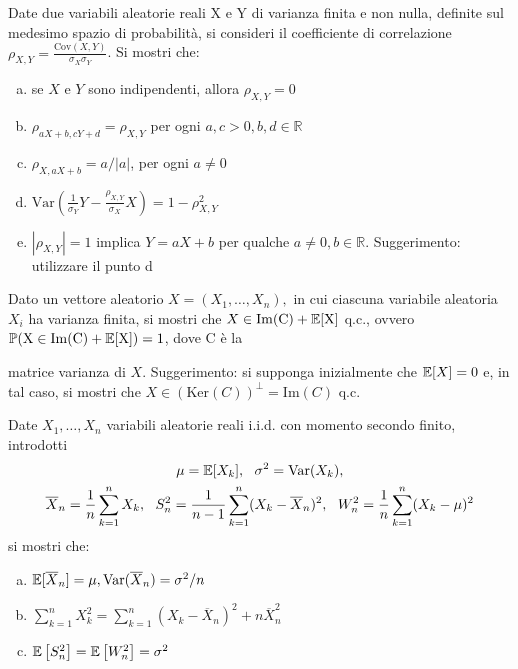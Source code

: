 
\ParteEsercizi

\Esercizio{}

Date due variabili aleatorie reali X e Y di varianza finita e non nulla, definite sul medesimo spazio di probabilità, si consideri il coefficiente di correlazione $\rho_{X,Y} =\frac{\mathrm{Cov} (X,Y)}{\sigma_{X} \sigma_{Y}}$. Si mostri che:
\begin{enumerate}[a)]
	\item se $X$ e $Y$ sono indipendenti, allora $\rho_{X,Y} =0$
	\item $\rho_{aX+b,cY+d} =\rho_{X,Y}$ per ogni $a,c >0,b,d\in \mathbb{R}$
	\item $\rho_{X,aX+b} =a/|a|$, per ogni $a\neq 0$
	\item $\mathrm{Var}\left(\frac{1}{\sigma_{Y}} Y-\frac{\rho_{X,Y}}{\sigma_{X}} X\right)=1-\rho_{X,Y}^{2}$
	\item $| \rho_{X,Y}| =1$ implica $Y=aX+b$ per qualche $a\neq 0,b\in \mathbb{R}$. Suggerimento: utilizzare il punto d
\end{enumerate}

\Esercizio{$\star$}

Dato un vettore aleatorio $X=(X_{1} ,\dots ,X_{n}) ,$ in cui ciascuna variabile aleatoria $X_{i}$ ha varianza finita, si mostri che $X\in \mathrm{Im} (\mathrm{C})+\mathbb{E}[\mathrm{X}]$ q.c., ovvero $\mathbb{P} (\mathrm{X} \in \mathrm{Im} (\mathrm{C})+\mathbb{E}[\mathrm{X}])=1$, dove $\mathrm{C}$ è la

matrice varianza di $X$. Suggerimento: si supponga inizialmente che $\mathbb{E}[X]=0$ e, in tal caso, si mostri che $X\in (\mathrm{Ker} (C))^{\perp } =\mathrm{Im} (C)$ q.c.

\Esercizio{}\label{sec:ese3}

Date $X_{1} ,\dots ,X_{n}$ variabili aleatorie reali i.i.d. con momento secondo finito, introdotti
\begin{gather*}
\mu =\mathbb{E}[X_{k}] ,\ \ \sigma^{2} =\mathrm{Var}(X_{k}) ,\\
\overline{X}_{n} =\frac{1}{n}\sum_{k=1}^{n} X_{k} ,\ \ S_{n}^{2} =\frac{1}{n-1}\sum_{k=1}^{n}(X_{k} -\overline{X}_{n})^{2} ,\ \ W_{n}^{2} =\frac{1}{n}\sum_{k=1}^{n}(X_{k} -\mu)^{2}
\end{gather*}
si mostri che:
\begin{enumerate}[a)]
	\item $\mathbb{E}[\overline{X}_{n}] =\mu ,\mathrm{Var}(\overline{X}_{n}) =\sigma^{2} /n$
	\item\label{esercizio3b} $\sum_{k=1}^{n} X_{k}^{2} =\sum_{k=1}^{n}(X_{k} -\overline{X}_{n})^{2} +n\overline{X}_{n}^{2}$
	\item $\mathbb{E}\left[S_{n}^{2}\right] =\mathbb{E}\left[W_{n}^{2}\right] =\sigma^{2}$
\end{enumerate}

